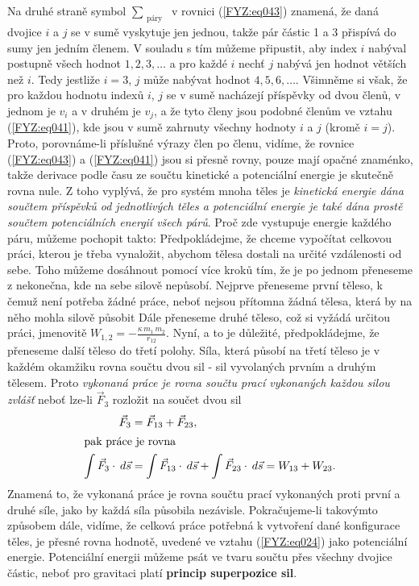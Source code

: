     Na druhé straně symbol \(\sum_{\substack{\text{páry}}}\)  v rovnici (\ref{FYZ:eq043}) znamená, 
    že daná dvojice \(i\) a \(j\) se v sumě vyskytuje jen jednou, takže pár částic \num{1} a 
    \num{3} přispívá do sumy jen jedním členem. V souladu s tím můžeme připustit, aby index \(i\) 
    nabýval postupně všech hodnot \(1, 2, 3, \ldots\) a pro každé \(i\) nechť \(j\) nabývá jen 
    hodnot větších než \(i\). Tedy jestliže \(i = 3\), \(j\) může nabývat hodnot \(4, 5, 6, 
    \ldots\). Všimněme si však, že pro každou hodnotu indexů \(i\), \(j\) se v sumě nacházejí 
    příspěvky od dvou členů, v jednom je \(v_i\) a v druhém je \(v_j\), a že tyto členy jsou 
    podobné členům ve vztahu  (\ref{FYZ:eq041}), kde jsou v sumě zahrnuty všechny hodnoty \(i\) a 
    \(j\) (kromě \(i=j\)). Proto, porovnáme-li příslušné výrazy člen po členu, vidíme, že rovnice  
    (\ref{FYZ:eq043}) a  (\ref{FYZ:eq041}) jsou si přesně rovny, pouze mají opačné znaménko, takže 
    derivace podle času ze součtu kinetické a potenciální energie je skutečně rovna nule. Z toho 
    vyplývá, že pro systém mnoha těles je \emph{kinetická energie dána součtem příspěvků od 
    jednotlivých těles a potenciální energie je také dána prostě součtem potenciálních energií 
    všech párů}. Proč zde vystupuje energie každého páru, můžeme pochopit takto: Předpokládejme, že 
    chceme vypočítat celkovou práci, kterou je třeba vynaložit, abychom tělesa dostali na určité 
    vzdálenosti od sebe. Toho můžeme dosáhnout pomocí více kroků tím, že je po jednom přeneseme z 
    nekonečna, kde na sebe silově nepůsobí. Nejprve přeneseme první těleso, k čemuž není potřeba 
    žádné práce, neboť nejsou přítomna žádná tělesa, která by na něho mohla silově působit Dále 
    přeneseme druhé těleso, což si vyžádá určitou práci, jmenovitě \(W_{1,2} = - 
    \frac{\kappa\,m_1\,m_2}{r_{12}}\). Nyní, a to je důležité, předpokládejme, že přeneseme další 
    těleso do třetí polohy. Síla, která působí na třetí těleso je v každém okamžiku rovna součtu 
    dvou sil - sil vyvolaných prvním a druhým tělesem. Proto \emph{vykonaná práce je rovna součtu 
    prací vykonaných každou silou zvlášť} neboť lze-li \(\vec{F}_3\) rozložit na součet dvou sil
    \begin{align*}
     \vec{F}_3 &= \vec{F}_{13} + \vec{F}_{23},        \\
      \shortintertext{pak práce je rovna}
      \int\vec{F}_3\cdot\hspace{2pt}d\vec{s} 
                &=  \int\vec{F}_{13}\cdot\hspace{2pt}d\vec{s} + 
                    \int\vec{F}_{23}\cdot\hspace{2pt}d\vec{s}
                 = W_{13} + W_{23}. 
    \end{align*}
    Znamená to, že vykonaná práce je rovna součtu prací vykonaných proti první a druhé síle, jako 
    by každá síla působila nezávisle. Pokračujeme-li takovýmto způsobem dále, vidíme, že celková 
    práce potřebná k vytvoření dané konfigurace těles, je přesné rovna hodnotě, uvedené ve vztahu 
    (\ref{FYZ:eq024}) jako potenciální energie. Potenciální energii můžeme psát ve tvaru součtu 
    přes všechny dvojice částic, neboť pro gravitaci platí \textbf{princip superpozice sil}.
    
